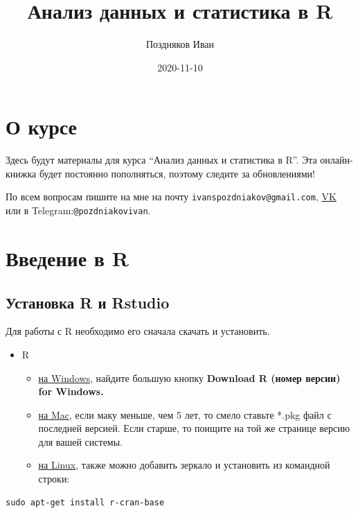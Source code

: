 \documentclass[]{book}
\title{Анализ данных и статистика в R}
\author{Поздняков Иван}
\date{2020-11-10}
\providecommand{\tightlist}{%
  \setlength{\itemsep}{0pt}\setlength{\parskip}{0pt}}
\begin{document}
\maketitle

{
\setcounter{tocdepth}{1}
\tableofcontents
}
\chapter{О курсе}\label{ux43e-ux43aux443ux440ux441ux435}

Здесь будут материалы для курса ``Анализ данных и статистика в R''. Эта
онлайн-книжка будет постоянно пополняться, поэтому следите за
обновлениями!

По всем вопросам пишите на мне на почту
\texttt{ivanspozdniakov@gmail.com},
\href{https://vk.com/id247411462}{VK} или в
Telegram:\texttt{@pozdniakovivan}.

\chapter{Введение в R}\label{intro}

\section{Установка R и Rstudio}\label{install}

Для работы с R необходимо его сначала скачать и установить.

\begin{itemize}
\tightlist
\item
  R

  \begin{itemize}
  \tightlist
  \item
    \href{https://cran.r-project.org/bin/windows/base/}{на Windows},
    найдите большую кнопку \textbf{Download R (номер версии) for
    Windows.}
  \item
    \href{https://cran.r-project.org/bin/macosx/}{на Mac}, если маку
    меньше, чем 5 лет, то смело ставьте *.pkg файл с последней версией.
    Если старше, то поищите на той же странице версию для вашей системы.
  \item
    \href{https://cran.rstudio.com/bin/linux/}{на Linux}, также можно
    добавить зеркало и установить из командной строки:
  \end{itemize}
\end{itemize}

\begin{verbatim}
sudo apt-get install r-cran-base
\end{verbatim}
\end{document}
